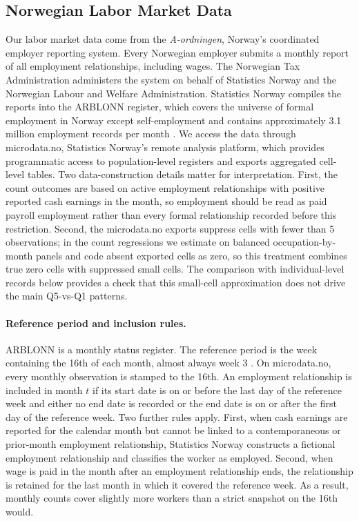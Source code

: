 \documentclass[12pt]{article}
\begin{document}
\subsection{Norwegian Labor Market Data}\label{sec:data:labor}

Our labor market data come from the \emph{A-ordningen}, Norway's coordinated employer reporting system. Every Norwegian employer submits a monthly report of all employment relationships, including wages. The Norwegian Tax Administration administers the system on behalf of Statistics Norway and the Norwegian Labour and Welfare Administration. Statistics Norway compiles the reports into the ARBLONN register, which covers the universe of formal employment in Norway except self-employment and contains approximately 3.1 million employment records per month \citep{ssb_arblonn_doc}. We access the data through microdata.no, Statistics Norway's remote analysis platform, which provides programmatic access to population-level registers and exports aggregated cell-level tables. Two data-construction details matter for interpretation. First, the count outcomes are based on active employment relationships with positive reported cash earnings in the month, so employment should be read as paid payroll employment rather than every formal relationship recorded before this restriction. Second, the microdata.no exports suppress cells with fewer than 5 observations; in the count regressions we estimate on balanced occupation-by-month panels and code absent exported cells as zero, so this treatment combines true zero cells with suppressed small cells. The comparison with individual-level records below provides a check that this small-cell approximation does not drive the main Q5-vs-Q1 patterns.

\paragraph{Reference period and inclusion rules.}
ARBLONN is a monthly status register. The reference period is the week containing the 16th of each month, almost always week 3 \citep{ssb_klassifisering}. On microdata.no, every monthly observation is stamped to the 16th. An employment relationship is included in month $t$ if its start date is on or before the last day of the reference week and either no end date is recorded or the end date is on or after the first day of the reference week. Two further rules apply. First, when cash earnings are reported for the calendar month but cannot be linked to a contemporaneous or prior-month employment relationship, Statistics Norway constructs a fictional employment relationship and classifies the worker as employed. Second, when wage is paid in the month after an employment relationship ends, the relationship is retained for the last month in which it covered the reference week. As a result, monthly counts cover slightly more workers than a strict snapshot on the 16th would.
\end{document}
